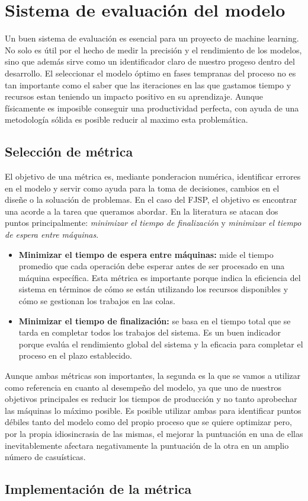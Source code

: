 \section{Sistema de evaluación del modelo}
    Un buen sistema de evaluación es esencial para un proyecto de machine learning. 
    No solo es útil por el hecho de medir la precisión y el rendimiento de los modelos, 
    sino que además sirve como un identificador claro de nuestro progeso dentro del desarrollo. 
    El seleccionar el modelo óptimo en fases tempranas del proceso no es tan importante 
    como el saber que las iteraciones en las que gastamos tiempo y recursos estan teniendo un impacto 
    positivo en su aprendizaje. Aunque físicamente es imposible conseguir una productividad 
    perfecta, con ayuda de una metodología sólida es posible reducir al maximo esta problemática.
    
    \subsection{Selección de métrica}
    El objetivo de una métrica es, mediante ponderacion numérica, identificar errores en el modelo y 
    servir como ayuda para la toma de decisiones, cambios en el diseñe o la soluación de problemas. En el caso del 
    FJSP, el objetivo es encontrar una acorde a la tarea que queramos abordar. En la literatura se atacan dos puntos
    principalmente: \textit{minimizar el tiempo de finalización} y \textit{minimizar el tiempo de espera entre máquinas}. 

    \begin{itemize}
        \item \textbf{Minimizar el tiempo de espera entre máquinas:} mide el tiempo promedio que cada operación debe 
        esperar antes de ser procesado en una máquina específica. Esta métrica es importante porque 
        indica la eficiencia del sistema en términos de cómo se están utilizando los recursos disponibles 
        y cómo se gestionan los trabajos en las colas.
        \item \textbf{Minimizar el tiempo de finalización:} se basa en el tiempo total que se tarda en completar todos 
        los trabajos del sistema. Es un buen indicador porque evalúa el rendimiento global del sistema 
        y la eficacia para completar el proceso en el plazo establecido. 
    \end{itemize}

    Aunque ambas métricas son importantes, la segunda es la que se vamos a utilizar como referencia en cuanto al
    desempeño del modelo, ya que uno de nuestros objetivos principales es reducir los tiempos de producción y no tanto
    aprobechar las máquinas lo máximo posible. Es posible utilizar ambas para identificar puntos débiles tanto del modelo 
    como del propio proceso que se quiere optimizar pero, por la propia idiosincrasia de las mismas, el mejorar la puntuación
    en una de ellas inevitablemente afectara negativamente la puntuación de la otra en un amplio número de casuísticas.

    \subsection{Implementación de la métrica} 


\pagebreak